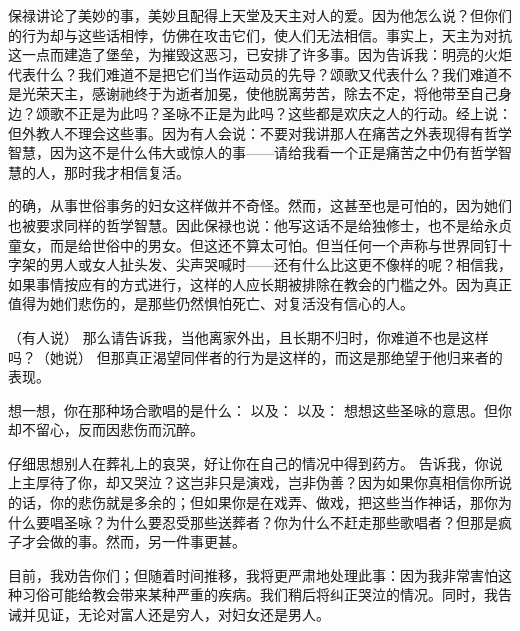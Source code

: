 保禄讲论了美妙的事，美妙且配得上天堂及天主对人的爱。因为他怎么说？但你们的行为却与这些话相悖，仿佛在攻击它们，使人们无法相信。事实上，天主为对抗这一点而建造了堡垒，为摧毁这恶习，已安排了许多事。因为告诉我：明亮的火炬代表什么？我们难道不是把它们当作运动员的先导？颂歌又代表什么？我们难道不是光荣天主，感谢祂终于为逝者加冕，使他脱离劳苦，除去不定，将他带至自己身边？颂歌不正是为此吗？圣咏不正是为此吗？这些都是欢庆之人的行动。经上说：但外教人不理会这些事。因为有人会说：不要对我讲那人在痛苦之外表现得有哲学智慧，因为这不是什么伟大或惊人的事——请给我看一个正是痛苦之中仍有哲学智慧的人，那时我才相信复活。\par

的确，从事世俗事务的妇女这样做并不奇怪。然而，这甚至也是可怕的，因为她们也被要求同样的哲学智慧。因此保禄也说：他写这话不是给独修士，也不是给永贞童女，而是给世俗中的男女。但这还不算太可怕。但当任何一个声称与世界同钉十字架的男人或女人扯头发、尖声哭喊时——还有什么比这更不像样的呢？相信我，如果事情按应有的方式进行，这样的人应长期被排除在教会的门槛之外。因为真正值得为她们悲伤的，是那些仍然惧怕死亡、对复活没有信心的人。\par

（有人说） 那么请告诉我，当他离家外出，且长期不归时，你难道不也是这样吗？（她说） 但那真正渴望同伴者的行为是这样的，而这是那绝望于他归来者的表现。\par

想一想，你在那种场合歌唱的是什么： 以及： 以及： 想想这些圣咏的意思。但你却不留心，反而因悲伤而沉醉。\par

仔细思想别人在葬礼上的哀哭，好让你在自己的情况中得到药方。 告诉我，你说上主厚待了你，却又哭泣？这岂非只是演戏，岂非伪善？因为如果你真相信你所说的话，你的悲伤就是多余的；但如果你是在戏弄、做戏，把这些当作神话，那你为什么要唱圣咏？为什么要忍受那些送葬者？你为什么不赶走那些歌唱者？但那是疯子才会做的事。然而，另一件事更甚。\par

目前，我劝告你们；但随着时间推移，我将更严肃地处理此事：因为我非常害怕这种习俗可能给教会带来某种严重的疾病。我们稍后将纠正哭泣的情况。同时，我告诫并见证，无论对富人还是穷人，对妇女还是男人。\par

